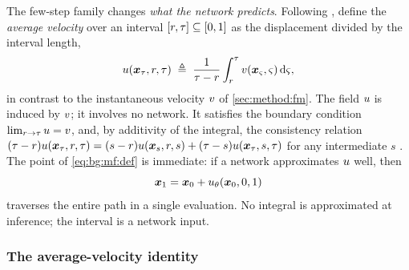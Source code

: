 The few-step family changes \emph{what the network predicts}. Following
\parencite[Eq.~(3)]{geng2025meanflow}, define the \emph{average velocity} over an interval
$[r,\tau] \subseteq [0,1]$ as the displacement divided by the interval length,
\begin{equation}\label{eq:bg:mf:def}
  u(\boldsymbol{x}_{\tau},r,\tau)
  \;\triangleq\; \frac{1}{\tau-r}\int_{r}^{\tau}v(\boldsymbol{x}_{\varsigma},\varsigma)\,\mathrm{d}\varsigma ,
\end{equation}
in contrast to the instantaneous velocity $v$ of \autoref{sec:method:fm}. The field $u$ is
induced by $v$; it involves no network. It satisfies the boundary condition
$\lim_{r\to\tau}u = v$, and, by additivity of the integral, the consistency
relation
$(\tau-r)u(\boldsymbol{x}_{\tau},r,\tau) = (s-r)u(\boldsymbol{x}_{s},r,s)
+ (\tau-s)u(\boldsymbol{x}_{\tau},s,\tau)$ for any intermediate $s$
\parencite[Sec.~4.1]{geng2025meanflow}. The point of \eqref{eq:bg:mf:def} is immediate: if a network
approximates $u$ well, then
\begin{equation}\label{eq:bg:mf:onestep}
  \boldsymbol{x}_{1} = \boldsymbol{x}_{0} + u_{\theta}(\boldsymbol{x}_{0},0,1)
\end{equation}
traverses the entire path in a single evaluation. No integral is approximated at inference;
the interval is a network input.

\subsubsection*{The average-velocity identity}

